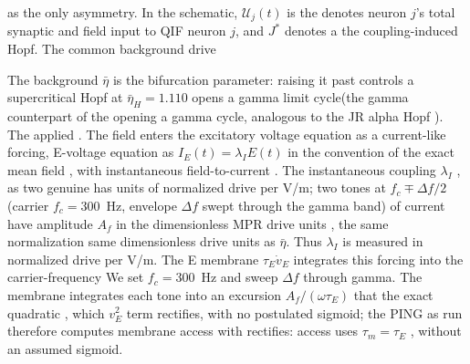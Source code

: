 \documentclass[11pt,a4paper]{article}
\providecommand{\DIFaddtex}[1]{{\protect\color{blue} \sf #1}} %
\providecommand{\DIFdeltex}[1]{{\protect\color{red} \scriptsize #1}} %
\providecommand{\DIFaddbegin}{} %
\providecommand{\DIFaddend}{} %
\providecommand{\DIFdelbegin}{} %
\providecommand{\DIFdelend}{} %
\providecommand{\DIFadd}[1]{\texorpdfstring{\DIFaddtex{#1}}{#1}} %
\providecommand{\DIFdel}[1]{\texorpdfstring{\DIFdeltex{#1}}{}} %
\begin{document}
\DIFdelend \DIFaddbegin \DIFadd{as the only asymmetry.
}\DIFaddend In the schematic, $\mathcal U_j(t)$ \DIFdelbegin \DIFdel{is the }\DIFdelend \DIFaddbegin \DIFadd{denotes neuron $j$'s }\DIFaddend total synaptic
and field input\DIFdelbegin \DIFdel{to QIF neuron $j$}\DIFdelend , and $J^*$ \DIFdelbegin \DIFdel{denotes a }\DIFdelend \DIFaddbegin \DIFadd{the }\DIFaddend coupling-induced Hopf.
\DIFdelbegin \DIFdel{The common background drive }\DIFdelend \DIFaddbegin

\DIFadd{The background }\DIFaddend $\bar\eta$ \DIFdelbegin \DIFdel{is the bifurcation parameter: raising it
past }\DIFdelend \DIFaddbegin \DIFadd{controls }\DIFaddend a supercritical Hopf \DIFdelbegin \DIFdel{at $\bar\eta_H=1.110$ opens a gamma
limit cycle(the gamma
counterpart of the }\DIFdelend \DIFaddbegin \DIFadd{opening a gamma
cycle, analogous to the }\DIFaddend JR alpha Hopf\DIFdelbegin \DIFdel{). The applied }\DIFdelend \DIFaddbegin \DIFadd{. The }\DIFaddend field enters the \DIFdelbegin \DIFdel{excitatory voltage equation as a current-like forcing, }\DIFdelend \DIFaddbegin \DIFadd{E-voltage
equation as }\DIFaddend $I_E(t)=\lambda_I E(t)$ \DIFdelbegin \DIFdel{in the convention of the exact mean field
\cite{ruffini2021nmm2}, with instantaneous field-to-current }\DIFdelend \DIFaddbegin \DIFadd{\cite{ruffini2021nmm2}.
The instantaneous }\DIFaddend coupling $\lambda_I$ \DIFdelbegin \DIFdel{, as two genuine }\DIFdelend \DIFaddbegin \DIFadd{has units of normalized drive per V/m;
two }\DIFaddend tones at $f_c\mp\Delta f/2$ \DIFdelbegin \DIFdel{(carrier $f_c=300$~Hz, envelope $\Delta f$ swept through the gamma band)
of current }\DIFdelend \DIFaddbegin \DIFadd{have }\DIFaddend amplitude $A_f$ in the \DIFdelbegin \DIFdel{dimensionless MPR drive units , the same
normalization }\DIFdelend \DIFaddbegin \DIFadd{same
dimensionless drive units }\DIFaddend as $\bar\eta$. \DIFdelbegin \DIFdel{Thus $\lambda_I$ is measured in normalized drive per V/m. The E membrane $\tau_E\dot v_E$
integrates this forcing into the carrier-frequency }\DIFdelend \DIFaddbegin \DIFadd{We set $f_c=300$~Hz and sweep
$\Delta f$ through gamma. The membrane integrates each tone into an
}\DIFaddend excursion $A_f/(\omega\tau_E)$\DIFdelbegin \DIFdel{that the
exact quadratic }\DIFdelend \DIFaddbegin \DIFadd{, which }\DIFaddend $v_E^2$ \DIFdelbegin \DIFdel{term rectifies, with no postulated sigmoid; the PING as run
therefore computes membrane access with }\DIFdelend \DIFaddbegin \DIFadd{rectifies: access uses
}\DIFaddend $\tau_m=\tau_E$\DIFaddbegin \DIFadd{, without an assumed sigmoid}\DIFaddend .
\end{document}
